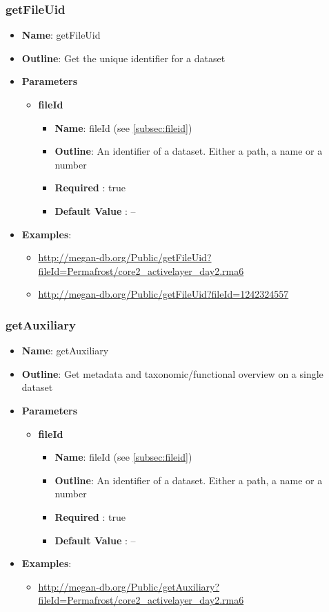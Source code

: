 \documentclass[11pt]{article}
\begin{document}
\subsubsection{getFileUid}

\begin{itemize}
	\item \textbf{Name}: getFileUid
	\item \textbf{Outline}: Get the unique identifier for a dataset
	\item \textbf{Parameters}
		\begin{itemize}
			\item \textbf{fileId}
				\begin{itemize}
					\item \textbf{Name}: fileId (see \ref{subsec:fileid})
					\item \textbf{Outline}: An identifier of a dataset. Either a path, a name or a number
					\item \textbf{Required} : true
					\item \textbf{Default Value} : --
				\end{itemize}
		\end{itemize}
	\item \textbf{Examples}:
		\begin{itemize}
			\item \url{http://megan-db.org/Public/getFileUid?fileId=Permafrost/core2_activelayer_day2.rma6}
			\item \url{http://megan-db.org/Public/getFileUid?fileId=1242324557}
		\end{itemize}
\end{itemize}

\subsubsection{getAuxiliary}

\begin{itemize}
	\item \textbf{Name}: getAuxiliary
	\item \textbf{Outline}: Get metadata and taxonomic/functional overview on a single dataset
	\item \textbf{Parameters}
		\begin{itemize}
			\item \textbf{fileId}
				\begin{itemize}
					\item \textbf{Name}: fileId (see \ref{subsec:fileid})
					\item \textbf{Outline}: An identifier of a dataset. Either a path, a name or a number
					\item \textbf{Required} : true
					\item \textbf{Default Value} : --
				\end{itemize}
		\end{itemize}
	\item \textbf{Examples}:
		\begin{itemize}
			\item \url{http://megan-db.org/Public/getAuxiliary?fileId=Permafrost/core2_activelayer_day2.rma6}
		\end{itemize}
\end{itemize}
\end{document}
